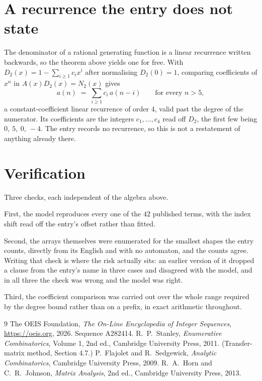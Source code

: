 \documentclass[11pt,a4paper]{article}
\theoremstyle{plain}
\theoremstyle{definition}
\begin{document}
\section{A recurrence the entry does not state}

The denominator of a rational generating function is a linear recurrence written backwards, so
the theorem above yields one for free. With $D_2(x)=1-\sum_{i\ge1}c_ix^i$ after normalising
$D_2(0)=1$, comparing coefficients of $x^n$ in $A(x)D_2(x)=N_2(x)$ gives
\[
a(n)\;=\;\sum_{i\ge1}c_i\,a(n-i)\qquad\text{for every }n>5,
\]
a constant-coefficient linear recurrence of order $4$, valid past the degree of the
numerator. Its coefficients are the integers $c_1,\dots,c_{4}$ read off $D_2$, the first few being $0,\ 5,\ 0,\ -4$. The entry records no recurrence, so this is not a restatement of anything
already there.

\section{Verification}

Three checks, each independent of the algebra above.

First, the model reproduces every one of the $42$ published terms, with the index shift
read off the entry's offset rather than fitted.

Second, the arrays themselves were enumerated for the smallest shapes the entry counts,
directly from its English and with no automaton, and the counts agree. Writing that check is
where the risk actually sits: an earlier version of it dropped a clause from the entry's name
in three cases and disagreed with the model, and in all three the check was wrong and the model
was right.

Third, the coefficient comparison was carried out over the whole range required by the degree
bound rather than on a prefix, in exact arithmetic throughout.

\begin{thebibliography}{9}
 The OEIS Foundation, \emph{The On-Line Encyclopedia of Integer
Sequences}, \url{https://oeis.org}, 2026. Sequence A282414.
 R.~P.~Stanley, \emph{Enumerative Combinatorics}, Volume 1, 2nd ed.,
Cambridge University Press, 2011. (Transfer-matrix method, Section 4.7.)
 P.~Flajolet and R.~Sedgewick, \emph{Analytic Combinatorics}, Cambridge
University Press, 2009.
 R.~A.~Horn and C.~R.~Johnson, \emph{Matrix Analysis}, 2nd ed., Cambridge
University Press, 2013.
\end{thebibliography}
\end{document}
